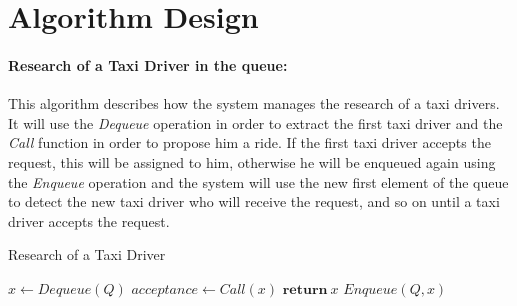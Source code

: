 \chapter{Algorithm Design} \label{chap3}
\subsubsection{Research of a Taxi Driver in the queue:}
This algorithm describes how the system manages the research of a taxi drivers. It will use the \textit{Dequeue} operation in order to extract the first taxi driver and the \textit{Call} function in order to propose him a ride. If the first taxi driver accepts the request, this will be assigned to him, otherwise he will be enqueued again using the \textit{Enqueue} operation and the system will use the new first element of the queue to detect the new taxi driver who will receive the request, and so on until a taxi driver accepts the request.

\begin{algorithm}[H]
\caption{Research of a Taxi Driver}
\begin{algorithmic}[1]
	\Else
		\State $x \gets Dequeue(Q)$
		\State $acceptance \gets Call(x)$
			\State $\textbf{return} \: x$
		\Else
			\State $Enqueue(Q, x)$
		\EndIf
	\EndFor
\EndIf
\EndProcedure
\end{algorithmic}
\end{algorithm}


